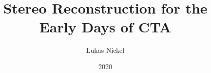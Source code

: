 \documentclass[
  oneside, %
  tucolor,       %
  BCOR=0mm,     %
  open=any,      %
]{tudothesis}
\author{Lukas Nickel}
\title{Stereo Reconstruction for the Early Days of CTA}
\date{2020}
\begin{document}
\frontmatter
\maketitle

\makecorrectorpage


\tableofcontents

\mainmatter

%









\newpage
\appendix



\backmatter
\printbibliography



\cleardoublepage

% 
\end{document}

